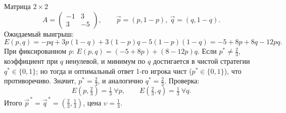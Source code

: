 \begin{Example}{Матрица $2\times2$}{}
	\[
	A=\begin{pmatrix} -1 & 3 \\ 3 & -5\end{pmatrix},\qquad
	\vec p=(p,1-p),\ \vec q=(q,1-q).
	\]
	Ожидаемый выигрыш:
	\[
	E(p,q)=-pq+3p(1-q)+3(1-p)q-5(1-p)(1-q)=-5+8p+8q-12pq.
	\]
	При фиксированном $p$: $E(p,q)=(-5+8p)+(8-12p)q$. Если $p^*\ne\tfrac23$, коэффициент при $q$ ненулевой, и минимум по $q$ достигается в чистой стратегии $q^*\in\{0,1\}$; но тогда и оптимальный ответ 1-го игрока чист ($p^*\in\{0,1\}$), что противоречиво. Значит, $p^*=\tfrac23$, и аналогично $q^*=\tfrac23$. Проверка:
	\[
	E\!\left(p,\tfrac23\right)=\tfrac13\ \forall p,\qquad E\!\left(\tfrac23,q\right)=\tfrac13\ \forall q.
	\]
	Итого $\vec p^{\,*}=\vec q^{\,*}=\left(\tfrac23,\tfrac13\right)$, цена $\upsilon=\tfrac13$.
\end{Example}
